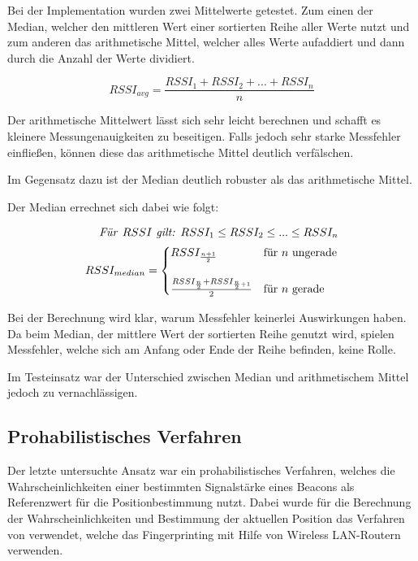 Bei der Implementation wurden zwei Mittelwerte getestet. Zum einen der Median, welcher den mittleren Wert einer sortierten Reihe aller Werte nutzt und zum anderen das arithmetische Mittel, welcher alles Werte aufaddiert und dann durch die Anzahl der Werte dividiert.

\begin{equation}
	RSSI_{avg} = \frac{RSSI_{1} + RSSI_{2} + ... + RSSI_{n}}{n}
\end{equation}

Der arithmetische Mittelwert lässt sich sehr leicht berechnen und schafft es kleinere Messungenauigkeiten zu beseitigen. Falls jedoch sehr starke Messfehler einfließen, können diese das arithmetische Mittel deutlich verfälschen.

Im Gegensatz dazu ist der Median deutlich robuster als das arithmetische Mittel.

Der Median errechnet sich dabei wie folgt: 

\begin{equation}
	\begin{split}
	\text{\emph{Für }}RSSI \text{\emph{ gilt: }} RSSI_{1} \leq RSSI_{2} \leq ... \leq RSSI_{n} \\
	RSSI_{median}=\begin{cases}
	RSSI_{\frac{n+1}{2}} & \text{für } n \text{ ungerade}\\ \\
	\frac{RSSI_{\frac{n}{2}} + RSSI_{\frac{n}{2}+1}}{2} & \text{für } n \text{ gerade} \\
	\end{cases}
	\end{split}
\end{equation}

Bei der Berechnung wird klar, warum Messfehler keinerlei Auswirkungen haben. Da beim Median, der mittlere Wert der sortierten Reihe genutzt wird, spielen Messfehler, welche sich am Anfang oder Ende der Reihe befinden, keine Rolle.

Im Testeinsatz war der Unterschied zwischen Median und arithmetischem Mittel jedoch zu vernachlässigen. 


\subsection{Prohabilistisches Verfahren}
\label{sec:implementation:fingerprinting:positioning:probability}
Der letzte untersuchte Ansatz war ein prohabilistisches Verfahren, welches die Wahrscheinlichkeiten einer bestimmten Signalstärke eines Beacons als Referenzwert für die Positionbestimmung nutzt. Dabei wurde für die Berechnung der Wahrscheinlichkeiten und Bestimmung der aktuellen Position das Verfahren von \citet{wifiFingerprintProbability} verwendet, welche das Fingerprinting mit Hilfe von Wireless LAN-Routern verwenden.

